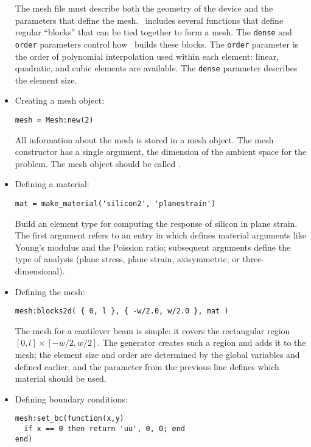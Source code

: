 \begin{itemize}
The mesh file must describe both the geometry of the device and the
parameters that define the mesh.  \hiq\ includes several functions
that define regular ``blocks'' that can be tied together to form a
mesh.  The \texttt{dense} and \texttt{order} parameters control how
\hiq\ builds these blocks.  The \texttt{order} parameter is the order
of polynomial interpolation used within each element: linear,
quadratic, and cubic elements are available.  The \texttt{dense}
parameter describes the element size.

\item Creating a mesh object:
\begin{verbatim}
mesh = Mesh:new(2)
\end{verbatim}

All information about the mesh is stored in a mesh object.  The mesh
constructor has a single argument, the dimension of the ambient space
for the problem.  The mesh object should be called .

\item Defining a material:
\begin{verbatim}
mat = make_material('silicon2', 'planestrain')
\end{verbatim}

Build an element type for computing the response of silicon in plane
strain.  The first argument refers to an entry in 
which defines material arguments like Young's modulus and the Poission
ratio; subsequent arguments define the type of analysis (plane stress,
plane strain, axisymmetric, or three-dimensional).


\item Defining the mesh:
\begin{verbatim}
mesh:blocks2d( { 0, l }, { -w/2.0, w/2.0 }, mat )
\end{verbatim}

The mesh for a cantilever beam is simple: it covers the rectangular
region $[0,l] \times [-w/2,w/2]$.  The  generator
creates such a region and adds it to the mesh; the element size and
order are determined by the global variables  and
 defined earlier, and the  parameter from the
previous line defines which material should be used.


\item Defining boundary conditions:
\begin{verbatim}
mesh:set_bc(function(x,y)
  if x == 0 then return 'uu', 0, 0; end
end)
\end{verbatim}


\end{itemize}
